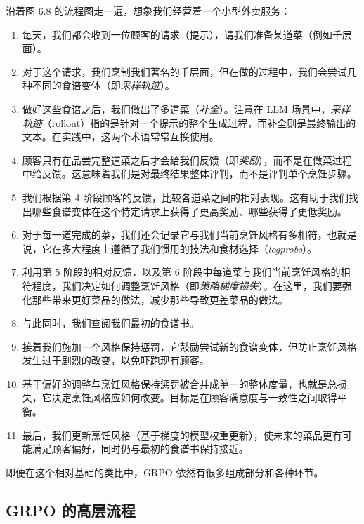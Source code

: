 
沿着图 6.8 的流程图走一遍，想象我们经营着一个小型外卖服务：

\begin{enumerate}
\item 每天，我们都会收到一位顾客的请求（提示），请我们准备某道菜（例如千层面）。
\item 对于这个请求，我们烹制我们著名的千层面，但在做的过程中，我们会尝试几种不同的食谱变体（即\emph{采样轨迹}）。
\item 做好这些食谱之后，我们做出了多道菜（\emph{补全}）。注意在 LLM 场景中，\emph{采样轨迹}（rollout）指的是针对一个提示的整个生成过程，而补全则是最终输出的文本。在实践中，这两个术语常常互换使用。
\item 顾客只有在品尝完整道菜之后才会给我们反馈（即\emph{奖励}），而不是在做菜过程中给反馈。这意味着我们是对最终结果整体评判，而不是评判单个烹饪步骤。
\item 我们根据第 4 阶段顾客的反馈，比较各道菜之间的相对表现。这有助于我们找出哪些食谱变体在这个特定请求上获得了更高奖励、哪些获得了更低奖励。
\item 对于每一道完成的菜，我们还会记录它与我们当前烹饪风格有多相符，也就是说，它在多大程度上遵循了我们惯用的技法和食材选择（\emph{logprobs}）。
\item 利用第 5 阶段的相对反馈，以及第 6 阶段中每道菜与我们当前烹饪风格的相符程度，我们决定如何调整烹饪风格（即\emph{策略梯度损失}）。在这里，我们要强化那些带来更好菜品的做法，减少那些导致更差菜品的做法。
\item 与此同时，我们查阅我们最初的食谱书。
\item 接着我们施加一个风格保持惩罚，它鼓励尝试新的食谱变体，但防止烹饪风格发生过于剧烈的改变，以免吓跑现有顾客。
\item 基于偏好的调整与烹饪风格保持惩罚被合并成单一的整体度量，也就是总损失，它决定烹饪风格应如何改变。目标是在顾客满意度与一致性之间取得平衡。
\item 最后，我们更新烹饪风格（基于梯度的模型权重更新），使未来的菜品更有可能满足顾客偏好，同时仍与最初的食谱书保持接近。
\end{enumerate}

即便在这个相对基础的类比中，GRPO 依然有很多组成部分和各种环节。

\subsection{GRPO 的高层流程}

